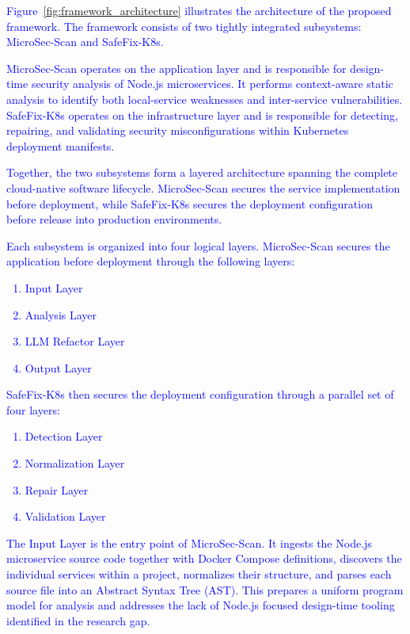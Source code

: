 \documentclass[preprint,12pt]{elsarticle}
\newcommand{\new}[1]{\textcolor{blue}{#1}}
\begin{document}

\new{Figure~\ref{fig:framework_architecture} illustrates the architecture of the
proposed framework. The framework consists of two tightly integrated
subsystems: MicroSec-Scan and SafeFix-K8s.}

\new{MicroSec-Scan operates on the application layer and is responsible for
design-time security analysis of Node.js microservices. It performs
context-aware static analysis to identify both local-service weaknesses and
inter-service vulnerabilities. SafeFix-K8s operates on the infrastructure
layer and is responsible for detecting, repairing, and validating security
misconfigurations within Kubernetes deployment manifests.}

\new{Together, the two subsystems form a layered architecture spanning the
complete cloud-native software lifecycle. MicroSec-Scan secures the service
implementation before deployment, while SafeFix-K8s secures the deployment
configuration before release into production environments.}


\new{Each subsystem is organized into four logical layers. MicroSec-Scan secures
the application before deployment through the following layers:}

\new{
\begin{enumerate}
\item Input Layer
\item Analysis Layer
\item LLM Refactor Layer
\item Output Layer
\end{enumerate}
}

\new{SafeFix-K8s then secures the deployment configuration through a parallel set
of four layers:}

\new{
\begin{enumerate}
\item Detection Layer
\item Normalization Layer
\item Repair Layer
\item Validation Layer
\end{enumerate}
}

\new{The Input Layer is the entry point of MicroSec-Scan. It ingests the Node.js
microservice source code together with Docker Compose definitions, discovers
the individual services within a project, normalizes their structure, and
parses each source file into an Abstract Syntax Tree (AST). This prepares a
uniform program model for analysis and addresses the lack of Node.js focused
design-time tooling identified in the research gap.}
\end{document}
